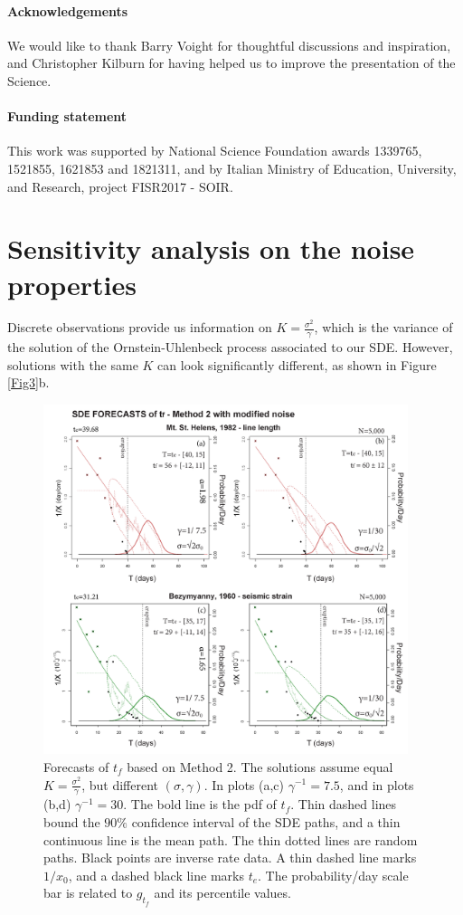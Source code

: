 \documentclass{article}
\begin{document}
\paragraph{Acknowledgements}
We would like to thank Barry Voight for thoughtful discussions and inspiration, and Christopher Kilburn for having helped us to improve the presentation of the Science.

\paragraph{Funding statement}
This work was supported by National Science Foundation awards 1339765, 1521855, 1621853 and 1821311, and by Italian Ministry of Education, University, and Research, project FISR2017 - SOIR.

\newpage
\appendix
\section{Sensitivity analysis on the noise properties}\label{A-2}
Discrete observations provide us information on $K=\frac{\sigma^2}{\gamma}$, which is the variance of the solution of the Ornstein-Uhlenbeck process associated to our SDE. However, solutions with the same $K$ can look significantly different, as shown in Figure \ref{Fig3}b.

\begin{figure}[H]
\centering
\includegraphics[width=0.95\textwidth]{Fig12_plusX.png}
\caption{Forecasts of $t_f$ based on Method 2. The solutions assume equal $K=\frac{\sigma^2}{\gamma}$, but different $(\sigma, \gamma)$. In plots (a,c) $\gamma^{-1}=7.5$, and in plots (b,d) $\gamma^{-1}=30$. The bold line is the pdf of $t_f$. Thin dashed lines bound the $90\%$ confidence interval of the SDE paths, and a thin continuous line is the mean path. The thin dotted lines are random paths. Black points are inverse rate data. A thin dashed line marks $1/x_0$, and a dashed black line marks $t_e$. The probability/day scale bar is related to $g_{t_f}$ and its percentile values.}
\label{Fig12}
\end{figure}
\end{document}
